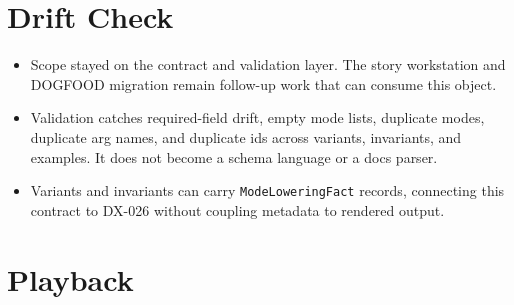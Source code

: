\section{Drift Check}\label{record-125-drift-check}

\begin{itemize}
\tightlist
\item
  Scope stayed on the contract and validation layer. The story workstation and DOGFOOD migration remain follow-up work that can consume this object.
\item
  Validation catches required-field drift, empty mode lists, duplicate modes, duplicate arg names, and duplicate ids across variants, invariants, and examples. It does not become a schema language or a docs parser.
\item
  Variants and invariants can carry \texttt{M\allowbreak{}o\allowbreak{}d\allowbreak{}e\allowbreak{}L\allowbreak{}o\allowbreak{}w\allowbreak{}e\allowbreak{}r\allowbreak{}i\allowbreak{}n\allowbreak{}g\allowbreak{}F\allowbreak{}a\allowbreak{}c\allowbreak{}t} records, connecting this contract to DX-026 without coupling metadata to rendered output.
\end{itemize}

\section{Playback}\label{record-125-playback}


